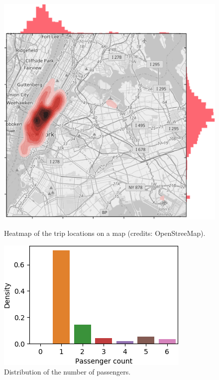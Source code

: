 \documentclass[a4paper]{article}
\begin{document}
\begin{figure}
    \centering
    \begin{minipage}{.45\textwidth}
        \includegraphics[width=\linewidth]{map_kde}
        \caption{Heatmap of the trip locations on a map (credits: OpenStreeMap).}
        \label{heatmap}
    \end{minipage}
    \hspace{0.05\textwidth}
   \begin{minipage}{.45\textwidth}
       \includegraphics[width=\linewidth]{passenger_count}
       \caption{Distribution of the number of passengers.}
       \label{passenger_count}
    \end{minipage}
\end{figure}
\end{document}
